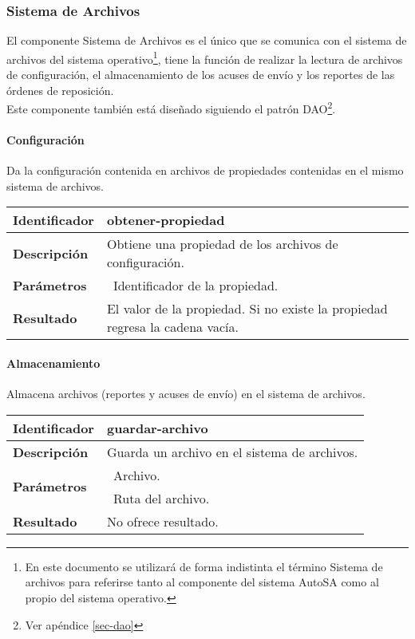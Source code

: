 \subsubsection{Sistema de Archivos}
El componente Sistema de Archivos es el único que se comunica con el sistema de archivos del sistema operativo\footnote{En este documento se utilizará de forma indistinta el término Sistema de archivos para referirse tanto al componente del sistema AutoSA como al propio del sistema operativo.}, tiene la función de realizar la lectura de archivos de configuración, el almacenamiento de los acuses de envío  y los reportes de las órdenes de reposición.\\
Este componente también está diseñado siguiendo el patrón DAO\footnote{Ver apéndice \ref{sec-dao}}.
\paragraph{Configuración\\}
Da la configuración contenida en archivos de propiedades contenidas en el mismo sistema de archivos.
	\vspace{5mm}\\
	\begin{tabular}{|p{}|p{}|}
		\hline
		\textbf{Identificador}	& \textbf{obtener-propiedad}\\
		\hline
		\hline
		\textbf{Descripción}	& Obtiene una propiedad de los archivos de configuración.\\
		\hline
		\textbf{Parámetros}		& \textbullet\, Identificador de la propiedad.\\
		\hline
		\textbf{Resultado}		& El valor de la propiedad. Si no existe la propiedad regresa la cadena vacía.\\
		\hline
	\end{tabular}
	\vspace{5mm}
\paragraph{Almacenamiento\\}
Almacena archivos (reportes y acuses de envío) en el sistema de archivos.
	\vspace{5mm}\\
	\begin{tabular}{|p{}|p{}|}
		\hline
		\textbf{Identificador}	& \textbf{guardar-archivo}\\
		\hline
		\hline
		\textbf{Descripción}	& Guarda un archivo en el sistema de archivos.\\
		\hline
		\multirow{2}{*}{\textbf{Parámetros}}	& \textbullet\, Archivo.\\
												& \textbullet\, Ruta del archivo.\\
		\hline
		\textbf{Resultado}		& No ofrece resultado.\\
		\hline
	\end{tabular}
	\vspace{5mm}

